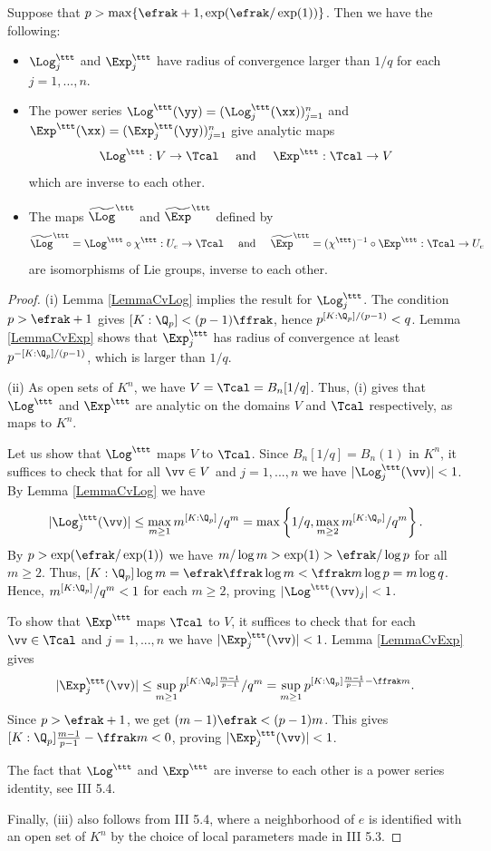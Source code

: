 \begin{lemma}
\notready\label{LemmaKeyLogExp} Suppose that $p>\max\{\efrak +1 , \exp(\efrak/\exp(1))\}$. Then we have the following:
\begin{itemize}
\item[(i)]  $\Log^\ttt_j$ and $\Exp^\ttt_j$ have radius of convergence larger than $1/q$ for each $j=1,...,n$.
\item[(ii)] The power series $\Log^\ttt(\yy)=(\Log^\ttt_j(\xx))_{j=1}^n$ and $\Exp^\ttt(\xx)=(\Exp^\ttt_j(\yy))_{j=1}^n$ give analytic maps
$$
\Log^\ttt : V\to \Tcal\quad  \mbox{ and }\quad \Exp^\ttt:\Tcal\to V
$$
which are inverse to each other.
\item[(iii)] The maps $\widetilde{\Log}^\ttt$ and $\widetilde{\Exp}^\ttt$ defined by
$$
\widetilde{\Log}^\ttt=\Log^\ttt \circ \chi^\ttt: U_e\to \Tcal\quad  \mbox{ and }\quad \widetilde{\Exp}^\ttt=(\chi^\ttt)^{-1}\circ \Exp^\ttt:\Tcal\to U_e
$$
are isomorphisms of Lie groups, inverse to each other.
\end{itemize}
\end{lemma}
\begin{proof} (i)  Lemma \ref{LemmaCvLog} implies the result for $\Log^\ttt_j$. The condition $p>\efrak+1$ gives $[K:\Q_p]<(p-1)\ffrak$, hence $p^{[K:\Q_p]/(p-1)}<q$. Lemma \ref{LemmaCvExp} shows that $\Exp^\ttt_j$ has radius of convergence at least $p^{-[K:\Q_p]/(p-1)}$, which is larger than $1/q$.

(ii) As open sets of $K^n$, we have $V=\Tcal=B_n[1/q]$. Thus, (i) gives that $\Log^\ttt$ and $\Exp^\ttt$ are analytic on the domains $V$ and $\Tcal$ respectively, as maps to $K^n$.

Let us show that $\Log^\ttt$ maps $V$ to $\Tcal$. Since $B_n[1/q]=B_n(1)$ in $K^n$, it suffices to check that for all $\vv\in V$ and $j=1,...,n$ we have $|\Log^\ttt_j(\vv)|<1$. By Lemma \ref{LemmaCvLog} we have
$$
|\Log^\ttt_j(\vv)|\le \max_{m\ge 1} m^{[K:\Q_p]}/q^m =\max\left\{1/q , \max_{m\ge 2} m^{[K:\Q_p]}/q^m\right\}.
$$
By $p>\exp(\efrak/\exp(1))$ we have $m/\log m> \exp(1)> \efrak/\log p$ for all $m\ge 2$. Thus, $[K:\Q_p]\log m =\efrak\ffrak\log m < \ffrak m\log p=m\log q$. Hence, $m^{[K:\Q_p]}/q^m<1$ for each $m\ge 2$, proving  $|\Log^\ttt(\vv)_j|<1$.

To show that $\Exp^\ttt$ maps $\Tcal$ to $V$, it suffices to check that for each $\vv\in \Tcal$ and $j=1,...,n$ we have $|\Exp^\ttt_j(\vv)|<1$. Lemma \ref{LemmaCvExp} gives
$$
|\Exp^\ttt_j(\vv)|\le \sup_{m\ge 1} p^{[K:\Q_p]\frac{m-1}{p-1}}/q^m = \sup_{m\ge 1} p^{[K:\Q_p]\frac{m-1}{p-1} -\ffrak m}.
$$
Since $p>\efrak+1$, we get $(m-1)\efrak < (p-1)m$. This gives $[K:\Q_p]\frac{m-1}{p-1} -\ffrak m<0$, proving $|\Exp^\ttt_j(\vv)|<1$.

The fact that $\Log^\ttt$ and $\Exp^\ttt$ are inverse to each other is a power series identity, see \cite{Bourbaki} III 5.4.

Finally, (iii) also follows from \cite{Bourbaki} III 5.4, where a neighborhood of $e$ is identified with an open set of $K^n$ by the choice of local parameters made in \cite{Bourbaki} III 5.3.
\end{proof}



